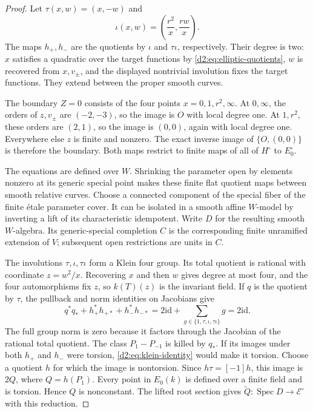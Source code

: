 \documentclass[11pt,a4paper]{amsart}
\numberwithin{equation}{section}
\theoremstyle{definition}
\theoremstyle{remark}
\newcommand{\DtwocE}{\mathcal E}
\newcommand{\Dtwowt}{\widetilde}
\newcommand{\Dtwoid}{\mathrm{id}}
\newcommand{\DtwoSpec}{\operatorname{Spec}}
\begin{document}
\begin{proof}
Let \(\tau(x,w)=(x,-w)\) and
\[
 \iota(x,w)=\left(\frac{r^2}{x},\frac{rw}{x}\right).
\]
The maps \(h_+,h_-\) are the quotients by \(\iota\) and
\(\tau\iota\), respectively.
Their degree is two: \(x\) satisfies a quadratic over the target
functions by \eqref{d2:eq:elliptic-quotients}, \(w\) is recovered from
\(x,v_\pm\), and the displayed nontrivial involution fixes the
target functions.
They extend between the proper smooth curves.

The boundary \(Z=0\) consists of the four points
\(x=0,1,r^2,\infty\).
At \(0,\infty\), the orders of \(z,v_\pm\) are \((-2,-3)\), so
the image is \(O\) with local degree one.
At \(1,r^2\), these orders are \((2,1)\), so the image is
\((0,0)\), again with local degree one.
Everywhere else \(z\) is finite and nonzero.
The exact inverse image of \(\{O,(0,0)\}\) is therefore the boundary.
Both maps restrict to finite maps of all of \(H^\circ\) to
\(E_0^\circ\).

The equations are defined over \(W\).
Shrinking the parameter open by elements nonzero at its generic
special point makes these finite flat quotient maps between smooth
relative curves.
Choose a connected component of the special fiber of the finite
\'etale parameter cover.
It can be isolated in a smooth affine \(W\)-model by inverting a
lift of its characteristic idempotent.
Write \(D\) for the resulting smooth \(W\)-algebra.
Its generic-special completion \(C\) is the corresponding finite
unramified extension of \(V\); subsequent open restrictions are
units in \(C\).

The involutions \(\tau,\iota,\tau\iota\) form a Klein four group.
Its total quotient is rational with coordinate \(z=w^2/x\).
Recovering \(x\) and then \(w\) gives degree at most four, and the
four automorphisms fix \(z\), so \(k(T)(z)\) is the invariant field.
If \(q\) is the quotient by \(\tau\), the pullback and norm identities
on Jacobians give
\begin{equation}\label{d2:eq:klein-identity}
 q^*q_*+h_+^*h_{+*}+h_-^*h_{-*}
   =2\Dtwoid+\sum_{g\in\{1,\tau,\iota,\tau\iota\}}g
   =2\Dtwoid.
\end{equation}
The full group norm is zero because it factors through the Jacobian
of the rational total quotient.
The class \(P_1-P_{-1}\) is killed by \(q_*\).
If its images under both \(h_+\) and \(h_-\) were torsion,
\eqref{d2:eq:klein-identity} would make it torsion.
Choose a quotient \(h\) for which the image is nontorsion.
Since \(h\tau=[-1]h\), this image is \(2Q\), where \(Q=h(P_1)\).
Every point in \(E_0(k)\) is defined over a finite field and is
torsion. Hence \(Q\) is nonconstant.
The lifted root section gives
\(\Dtwowt Q\colon\DtwoSpec D\to\DtwocE^\circ\) with this reduction.


\end{proof}
\end{document}
